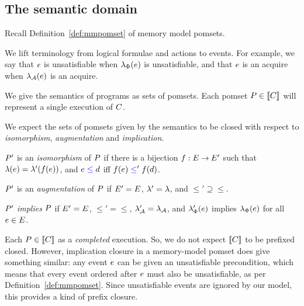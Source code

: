 

\subsection{The semantic domain}
\label{sec:sets}
Recall Definition~\ref{def:mmpomset} of memory model pomsets.

We lift terminology from logical formulae and actions to events. For example,
we say that $e$ is unsatisfiable when $\lambda_{\Phi}(e)$ is unsatisfiable,
and that $e$ is an acquire when $\lambda_{\mathcal{A}}(e)$ is an acquire.


We give the semantics of programs as sets of pomsets.  Each pomset
$P\in\llbracket C\rrbracket$ will represent a single execution of $C$.

We expect the sets of pomsets given by the semantics to be closed with
respect to \emph{isomorphism}, \emph{augmentation} and \emph{implication}.
\begin{definition}
  $P'$ is an \emph{isomorphism} of $P$ if there is a bijection
  $f:E\mathbin\rightarrow E'$ such that $\lambda(e)=\lambda'(f(e))$, and
  $e\mathrel{{\color{blue}\leq}}d$ iff $f(e)\mathrel{{\color{blue}\leq}}'f(d)$. %

  $P'$ is an \emph{augmentation} of $P$ if $E'=E$,
  ${\lambda'}={\lambda}$, and ${\le'}\supseteq{\le}$. %

  $P'$ \emph{implies} $P$ if $E'=E$, ${\le'}={\le}$,
  $\lambda_{\mathcal{A}}'=\lambda_{\mathcal{A}}$, and $\lambda_{\Phi}'(e)$
  implies $\lambda_{\Phi}(e)$ for all $e\in E$.
\end{definition}
Each
$P\in\llbracket C\rrbracket$ as a \emph{completed} execution.  So, we do not expect $\llbracket C\rrbracket$ to be prefixed closed.  However, implication
closure in a memory-model pomset does give something similar: any event
$e$ can be given an unsatisfiable precondition, which means that every
event ordered after $e$ must also be unsatisfiable, as per
Definition~\ref{def:mmpomset}.  Since unsatisfiable events are ignored by our model, this
provides a kind of prefix closure.

